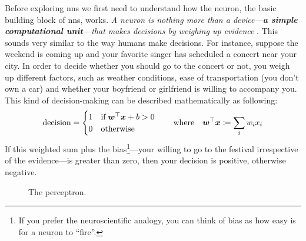 Before exploring \glspl{nn} we first need to understand how the neuron, the
basic building block of \glspl{nn}, works.  \emph{A neuron is nothing more than
a device---\textbf{a simple computational unit}---that makes decisions by weighing up
evidence} \parencite{Nielsen2018}. This sounds very similar to the way humans
make decisions. For instance, suppose the weekend is coming up and your favorite
singer has scheduled a concert near your city. In order to decide whether you
should go to the concert or not, you weigh up different factors, such as weather
conditions, ease of transportation (you don't own a car) and whether your
boyfriend or girlfriend is willing to accompany you. This kind of
decision-making can be described mathematically as following:
\begin{equation}
	\label{eq:perceptron}
	\text{decision}
	=
	\begin{cases}
		1 \quad \text{if}\; \boldsymbol{w}^\top \boldsymbol{x} + b > 0 \\
		0 \quad \text{otherwise}
	\end{cases}
	\quad
	\text{where}
	\quad
	\boldsymbol{w}^\top\boldsymbol{x} \coloneqq \sum_i w_i x_i
\end{equation}
If this weighted sum plus the bias\footnote{If
you prefer the neuroscientific analogy, you can think of bias as how easy is for
a neuron to ``fire''.}---your willing to go to the festival
irrespective of the evidence---is greater than zero, then your decision is
positive, otherwise negative.

\begin{figure}
	\centering
	\caption{The perceptron.}
	\label{fig:perceptron}
\end{figure}

